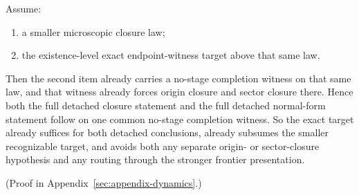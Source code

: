 \begin{corollary}
\label{cor:exact-target-closes-the-full-detached-closure-capstone}
Assume:
\begin{enumerate}
\item a smaller microscopic closure law;
\item the existence-level exact endpoint-witness target above that same law.
\end{enumerate}
Then the second item already carries a no-stage completion witness on that same
law, and that witness already forces origin closure and sector closure there.
Hence both the full detached closure statement and the full detached
normal-form statement follow on one common no-stage completion witness. So the
exact target already suffices for both detached conclusions,
already subsumes the smaller recognizable target, and avoids both any separate
origin- or sector-closure hypothesis and any routing through the stronger
frontier presentation.
\end{corollary}

(Proof in Appendix~\ref{sec:appendix-dynamics}.)

